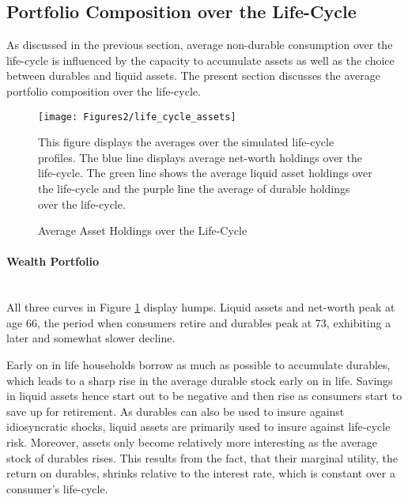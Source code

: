 \documentclass[a4paper,12pt,legno]{article}
\newcommand{\myparagraph}[1]{\paragraph{#1}\mbox{}\\}
\begin{document}
\subsection{Portfolio Composition over the Life-Cycle}
As discussed in the previous section, average non-durable consumption over the life-cycle is influenced by the capacity to accumulate assets as well as the choice between durables and liquid assets. The present section discusses the average portfolio composition over the life-cycle. 

\begin{figure}[!htbp]
\caption{Average Asset Holdings over the Life-Cycle} 
\label{asset_holdings_life_cycle}	%
\centering
\texttt{[image: Figures2/life\_cycle\_assets]}  %

\begin{minipage}{0.8\linewidth}
\footnotesize{This figure displays the averages over the simulated life-cycle profiles. The blue line displays average net-worth holdings over the life-cycle. The green line shows the average liquid asset holdings over the life-cycle and the purple line the average of durable holdings over the life-cycle.}
\end{minipage}

\end{figure}

\myparagraph{Wealth Portfolio} All three curves in Figure \ref{asset_holdings_life_cycle} display humps. Liquid assets and net-worth peak at age 66, the period when consumers retire and durables peak at 73, exhibiting a later and somewhat slower decline. 

Early on in life households borrow as much as possible to accumulate durables, which leads to a sharp rise in the average durable stock early on in life. Savings in liquid assets hence start out to be negative and then rise as consumers start to save up for retirement. As durables can also be used to insure against idiosyncratic shocks, liquid assets are primarily used to insure against life-cycle risk. Moreover, assets only become relatively more interesting as
the average stock of durables rises. This results from the fact, that their marginal utility, the return on durables, shrinks relative to the interest rate, which is constant over a consumer's life-cycle.
\end{document}
